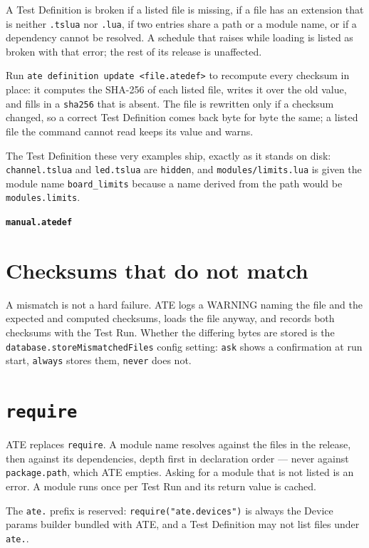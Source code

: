 A Test Definition is broken if a listed file is missing, if a file has an extension that is
neither \texttt{.tslua} nor \texttt{.lua}, if two entries share a path or a module name, or if a
dependency cannot be resolved. A schedule that raises while loading is listed as broken with
that error; the rest of its release is unaffected.

Run \texttt{ate definition update <file.atedef>} to recompute every checksum in place: it
computes the SHA-256 of each listed file, writes it over the old value, and fills in a
\texttt{sha256} that is absent. The file is rewritten only if a checksum changed, so a correct
Test Definition comes back byte for byte the same; a listed file the command cannot read keeps
its value and warns.

The Test Definition these very examples ship, exactly as it stands on disk: \texttt{channel.tslua}
and \texttt{led.tslua} are \texttt{hidden}, and \texttt{modules/limits.lua} is given the module
name \texttt{board\_limits} because a name derived from the path would be \texttt{modules.limits}.

\noindent\textbf{\texttt{manual.atedef}}\par


\section{Checksums that do not match}

A mismatch is not a hard failure. ATE logs a WARNING naming the file and the expected and
computed checksums, loads the file anyway, and records both checksums with the Test Run.
Whether the differing bytes are stored is the \texttt{database.storeMismatchedFiles} config
setting: \texttt{ask} shows a confirmation at run start, \texttt{always} stores them,
\texttt{never} does not.

\section{\texttt{require}}

ATE replaces \texttt{require}. A module name resolves against the files in the release, then
against its dependencies, depth first in declaration order --- never against
\texttt{package.path}, which ATE empties. Asking for a module that is not listed is an error.
A module runs once per Test Run and its return value is cached.

The \texttt{ate.} prefix is reserved: \texttt{require("ate.devices")} is always the Device
params builder bundled with ATE, and a Test Definition may not list files under \texttt{ate.}.


